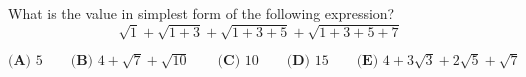 What is the value in simplest form of the following expression? \[\sqrt{1} + \sqrt{1+3} + \sqrt{1+3+5} + \sqrt{1+3+5+7}\]

$\textbf{(A) }5 \qquad \textbf{(B) }4 + \sqrt{7} + \sqrt{10} \qquad \textbf{(C) } 10 \qquad \textbf{(D) } 15 \qquad \textbf{(E) } 4 + 3\sqrt{3} + 2\sqrt{5} + \sqrt{7}$